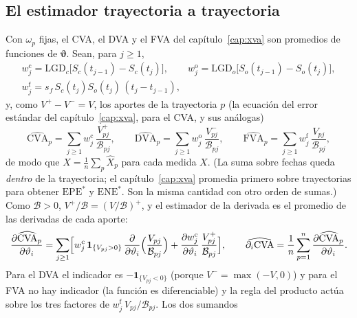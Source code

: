\begin{sloppypar}
\subsection{El estimador trayectoria a trayectoria}\label{sec:cap16-estimador}

Con $\omega_p$ fijas, el CVA, el DVA y el FVA del capítulo~\ref{cap:xva} son promedios de funciones de $\boldsymbol\vartheta$.
Sean, para $j\ge1$,
\begin{equation}\label{eq:cap16-pesos}
\begin{gathered}
  w^{\mathrm c}_j=\mathrm{LGD}_c\bigl[S_c(t_{j-1})-S_c(t_j)\bigr],\qquad
  w^{\mathrm o}_j=\mathrm{LGD}_o\bigl[S_o(t_{j-1})-S_o(t_j)\bigr],\\[2pt]
  w^{\mathrm f}_j=s_f\,S_c(t_j)S_o(t_j)\,(t_j-t_{j-1}),
\end{gathered}
\end{equation}
y, como $V^+-V^-=V$, los aportes de la trayectoria $p$ (la ecuación del error estándar del capítulo~\ref{cap:xva}, para
el CVA, y sus análogas)
\begin{equation}\label{eq:cap16-contribuciones}
  \widehat{\mathrm{CVA}}_p=\sum_{j\ge1}w^{\mathrm c}_j\,\frac{V^+_{pj}}{\mathcal B_{pj}},\qquad
  \widehat{\mathrm{DVA}}_p=\sum_{j\ge1}w^{\mathrm o}_j\,\frac{V^-_{pj}}{\mathcal B_{pj}},\qquad
  \widehat{\mathrm{FVA}}_p=\sum_{j\ge1}w^{\mathrm f}_j\,\frac{V_{pj}}{\mathcal B_{pj}},
\end{equation}
de modo que $X=\tfrac1n\sum_p\widehat X_p$ para cada medida $X$. (La suma sobre fechas queda \emph{dentro} de la
trayectoria; el capítulo~\ref{cap:xva} promedia primero sobre trayectorias para obtener $\mathrm{EPE}^*$ y
$\mathrm{ENE}^*$. Son la misma cantidad con otro orden de sumas.) Como $\mathcal B>0$, $V^+/\mathcal B=(V/\mathcal B)^+$,
y el estimador de la derivada es el promedio de las derivadas de cada aporte:
\begin{equation}\label{eq:cap16-pathwise}
  \frac{\partial\widehat{\mathrm{CVA}}_p}{\partial\vartheta_i}=\sum_{j\ge1}\Bigl[
  w^{\mathrm c}_j\,\mathbf 1_{\{V_{pj}>0\}}\,\frac{\partial}{\partial\vartheta_i}\Bigl(\frac{V_{pj}}{\mathcal B_{pj}}\Bigr)
  +\frac{\partial w^{\mathrm c}_j}{\partial\vartheta_i}\,\frac{V^+_{pj}}{\mathcal B_{pj}}\Bigr],\qquad
  \widehat{\partial_i\mathrm{CVA}}=\frac1n\sum_{p=1}^{n}\frac{\partial\widehat{\mathrm{CVA}}_p}{\partial\vartheta_i}.
\end{equation}
Para el DVA el indicador es $-\mathbf 1_{\{V_{pj}<0\}}$ (porque $V^-=\max(-V,0)$) y para el FVA no hay indicador
(la función es diferenciable) y la regla del producto actúa sobre los tres factores de $w^{\mathrm f}_j\,V_{pj}/\mathcal B_{pj}$. Los dos sumandos

\end{sloppypar}

